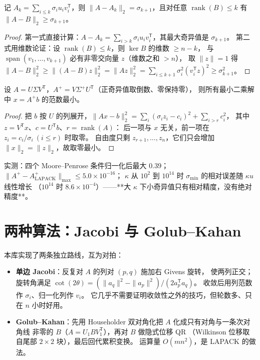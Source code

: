 \begin{theorem}
\label{thm:eym}
记 $A_k=\sum_{i\le k}\sigma_iu_iv_i^{\mathsf T}$，则
$\|A-A_k\|_2=\sigma_{k+1}$，且对任意 $\operatorname{rank}(B)\le k$ 有
$\|A-B\|_2\ge\sigma_{k+1}$。
\end{theorem}

\begin{proof}
第一式直接计算：$A-A_k=\sum_{i>k}\sigma_iu_iv_i^{\mathsf T}$，其最大奇异值是 $\sigma_{k+1}$。
第二式用维数论证：设 $\operatorname{rank}(B)\le k$，则 $\ker B$ 的维数 $\ge n-k$，
与 $\operatorname{span}(v_1,\dots,v_{k+1})$ 必有非零交向量 $z$（维数之和 $>n$），
取 $\|z\|=1$ 得
$\|A-B\|_2^2\ge\|(A-B)z\|_2^2=\|Az\|_2^2=\sum_{i\le k+1}\sigma_i^2(v_i^{\mathsf T}z)^2\ge\sigma_{k+1}^2$。
\end{proof}

\begin{theorem}[伪逆与最小范数解]
\label{thm:pinv}
设 $A=U\Sigma V^{\mathsf T}$，$A^{+}=V\Sigma^{+}U^{\mathsf T}$（正奇异值取倒数、零保持零），
则所有最小二乘解中 $x=A^{+}b$ 的范数最小。
\end{theorem}

\begin{proof}
把 $b$ 按 $U$ 的列展开，$\|Ax-b\|_2^2=\sum_i(\sigma_iz_i-c_i)^2+\sum_{i>r}c_i^2$，
其中 $z=V^{\mathsf T}x$、$c=U^{\mathsf T}b$、$r=\operatorname{rank}(A)$：
后一项与 $x$ 无关，前一项在 $z_i=c_i/\sigma_i\ (i\le r)$ 时取零。
自由度只剩 $z_{r+1},\dots,z_n$，它们只会增加 $\|x\|_2=\|z\|_2$，故取零最小。
\end{proof}

实测：四个 Moore--Penrose 条件归一化后最大 $0.39$；
$\|A^{+}-A^{+}_{\text{LAPACK}}\|_{\max}\le5.0\times10^{-16}$；
$\kappa$ 从 $10^{2}$ 到 $10^{14}$ 时 $\sigma_{\min}$ 的相对误差随 $\kappa u$ 线性增长
（$10^{14}$ 时 $8.6\times10^{-4}$）——**大 $\kappa$ 下小奇异值只有相对精度，没有绝对精度**。

\section{两种算法：Jacobi 与 Golub--Kahan}

本库实现了两条独立路线，互为对拍：

\begin{itemize}
  \item \textbf{单边 Jacobi}：反复对 $A$ 的列对 $(p,q)$ 施加右 Givens 旋转，
        使两列正交；旋转角满足 $\cot(2\theta)=(\|a_q\|^2-\|a_p\|^2)/(2a_p^{\mathsf T}a_q)$。
        收敛后用列范数作 $\sigma_i$、归一化列作 $v_i$。
        它几乎不需要证明收敛性之外的技巧，但轮数多、只在 $n$ 小时好用。
  \item \textbf{Golub--Kahan}：先用 Householder 双对角化把 $A$ 化成只有对角与一条次对角线
        非零的 $B$（$A=U_1BV_1^{\mathsf T}$），再对 $B$ 做隐式位移 QR
        （Wilkinson 位移取自尾部 $2\times2$ 块），最后回代累积变换。
        运算量 $O(mn^2)$，是 LAPACK 的做法。
\end{itemize}

